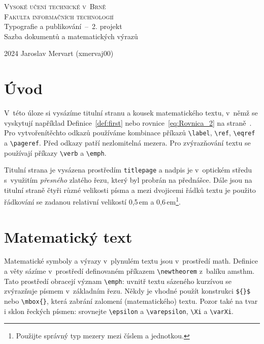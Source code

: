 \documentclass[twocolumn,11pt]{article}
\begin{document}
\begin{titlepage}

\begin{center}
    \Huge
	\textsc{Vysoké učení technické v~Brně}\\[0.5em]
    \huge
	{\textsc{Fakulta informačních technologií }}\\
	
	\LARGE
	Typografie a publikování \,--\ 2. projekt\\[0.6em]
	Sazba dokumentů a matematických výrazů\\
	
\end{center}

{\Large 2024 \hfill
Jaroslav Mervart (xmervaj00)}
\end{titlepage}
\newpage

\section*{Úvod}
V~této úloze si vysázíme titulní stranu a kousek matematického textu, v~němž se vyskytují například Definice~\ref{def:first} nebo rovnice~\eqref{eq:Rovnica_2} na straně~\pageref{eq:Rovnica_2}. Pro vytvořenítěchto odkazů používáme kombinace příkazů \verb|\label|, \verb|\ref|, \verb|\eqref| a \verb|\pageref|. Před odkazy patří nezlomitelná mezera. Pro zvýrazňování textu se používají příkazy \verb|\verb| a \verb|\emph|.

Titulní strana je vysázena prostředím \texttt{titlepage} a nadpis je v~optickém středu s~využitím \emph{přesného} zlatého řezu, který byl probrán na přednášce. Dále jsou na titulní straně čtyři různé velikosti písma a mezi dvojicemi řádků textu je použito řádkování se zadanou relativní velikostí 0,5\,em a 0,6\,em\footnote{Použijte správný typ mezery mezi číslem a jednotkou.}.

\section{Matematický text}
Matematické symboly a výrazy v~plynulém textu jsou v~prostředí math. Definice a věty sázíme v~prostředí definovaném příkazem \verb|\newtheorem| z~balíku amsthm. Tato prostředí obracejí význam \verb|\emph|: uvnitř textu sázeného kurzívou se zvýrazňuje písmem v~základním řezu. Někdy je vhodné použít konstrukci \verb|${}$| nebo \verb|\mbox{}|, která zabrání zalomení (matematického) textu. Pozor také na tvar i sklon řeckých písmen: srovnejte \verb|\epsilon| a \verb|\varepsilon|, \verb|\Xi| a \verb|\varXi|.
\end{document}
